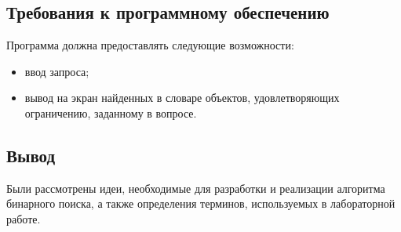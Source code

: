 \subsection{Требования к программному обеспечению}
\vspace{\baselineskip}

Программа должна предоставлять следующие возможности:
\begin{itemize}[label=---]
    \item ввод запроса;
    \item вывод на экран найденных в словаре объектов, удовлетворяющих ограничению, заданному в вопросе.
\end{itemize}

\vspace{\baselineskip}
\subsection*{Вывод}
\vspace{\baselineskip}

Были рассмотрены идеи, необходимые для разработки и реализации алгоритма бинарного поиска, а также определения терминов, используемых в лабораторной работе.

